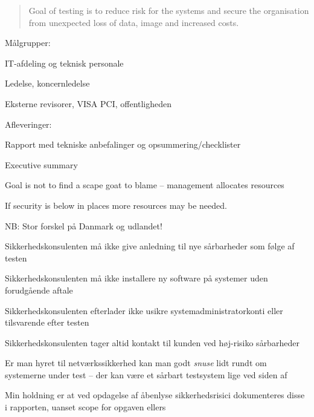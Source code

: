 \documentclass[Screen16to9,17pt]{foils}
\begin{document}

\begin{quote}
Goal of testing is to reduce risk for the systems and secure the organisation\\ from unexpected loss of data, image and increased costs.
\end{quote}

\begin{list1}
\item Målgrupper:
\begin{list2}
\item IT-afdeling og teknisk personale
\item Ledelse, koncernledelse
\item Eksterne revisorer, VISA PCI, offentligheden
\end{list2}
\item Afleveringer:
\begin{list2}
\item Rapport med tekniske anbefalinger og opsummering/checklister
\item Executive summary
\end{list2}
\end{list1}

Goal is not to find a scape goat to blame -- management allocates resources

If security is below in places more resources may be needed.



\begin{list2}
\item NB: Stor forskel på Danmark og udlandet!
\item Sikkerhedskonsulenten må ikke give anledning til nye sårbarheder
  som følge af testen
\item Sikkerhedskonsulenten må ikke installere ny software på
  systemer uden forudgående aftale
\item Sikkerhedskonsulenten efterlader ikke usikre
  systemadministratorkonti eller tilsvarende efter testen
\item Sikkerhedskonsulenten tager altid kontakt til kunden ved
  høj-risiko sårbarheder
\item Er man hyret til netværkssikkerhed kan man godt \emph{snuse}
  lidt rundt om systemerne under test -- der kan være et sårbart
  testsystem lige ved siden af
\item Min holdning er at ved opdagelse af åbenlyse sikkerhedsrisici
  dokumenteres disse i rapporten, uanset scope for opgaven ellers
\end{list2}
\end{document}
